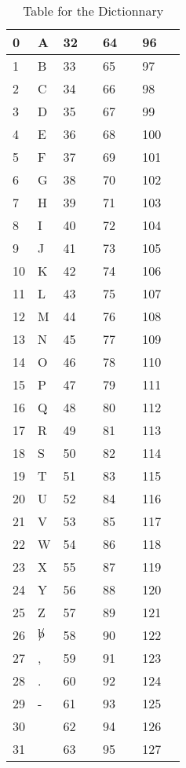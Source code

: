 \begin{table}[htbp]
  \centering
\begin{tabular}{||p{0.3 in}|p{0.6 in}||p{0.3 in}|p{0.6 in}||p{0.3 in}|p{0.6 in}||p{0.3 in}|p{0.6 in}||} \hline
0 & A & 32 & & 64 & & 96 &   \\ \hline
1 & B & 33 & & 65 & & 97 &   \\ \hline
2 & C & 34 & & 66 & & 98 &   \\ \hline
3 & D & 35 & & 67 & & 99 &   \\ \hline
4 & E & 36 & & 68 & & 100 &   \\ \hline
5 & F & 37 & & 69 & & 101 &   \\ \hline
6 & G & 38 & & 70 & & 102 &   \\ \hline
7 & H & 39 & & 71 & & 103 &   \\ \hline
8 & I & 40 & & 72 & & 104 &   \\ \hline
9 & J & 41 & & 73 & & 105 &   \\ \hline
10 & K & 42 & & 74 & & 106 &   \\ \hline
11 & L & 43 & & 75 & & 107 &   \\ \hline
12 & M & 44 & & 76 & & 108 &   \\ \hline
13 & N & 45 & & 77 & & 109 &   \\ \hline
14 & O & 46 & & 78 & & 110 &   \\ \hline
15 & P & 47 & & 79 & & 111 &   \\ \hline
16 & Q & 48 & & 80 & & 112 &   \\ \hline
17 & R & 49 & & 81 & & 113 &   \\ \hline
18 & S& 50 & & 82 & & 114 &   \\ \hline
19 & T & 51 & & 83 & & 115 &   \\ \hline
20 & U & 52 & & 84 & & 116&   \\ \hline
21 & V & 53 & & 85 & & 117 &   \\ \hline
22 & W & 54 & & 86 & & 118 &   \\ \hline
23 & X & 55 & & 87 & & 119 &   \\ \hline
24 & Y & 56 & & 88 & & 120 &   \\ \hline
25 & Z & 57 & & 89 & & 121 &   \\ \hline
26 & $\not b$ & 58 & & 90 & & 122 &   \\ \hline
27 & , & 59 & & 91 & & 123 &   \\ \hline
28 & . & 60 & & 92 & & 124 &   \\ \hline
29 & - & 61 & & 93 & & 125 &   \\ \hline
30 & & 62 & & 94 & & 126 &   \\ \hline
31 & & 63 & & 95 & & 127 &   \\ \hline
\end{tabular}
  \caption{Table for the Dictionnary}
  \label{tab:dico}
\end{table}
